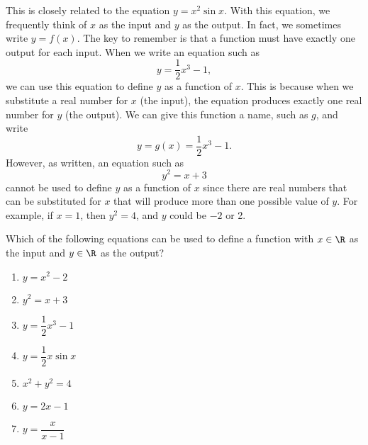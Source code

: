 \begin{previewactivity}
This is closely related to the equation  
$y = x^2 \sin x $.  With this equation, we frequently think of  $x$  as the input and  $y$  as the output.  In fact, we sometimes write  $y = f( x )$.  The key to remember is that a function must have exactly one output for each input.  When we write an equation such as  
\[
y = \dfrac{1}{2}x^3  - 1,
\]
we can use this equation to define  $y$  as a function of  $x$.  This is because when we substitute a real number for  $x$  (the input), the equation produces exactly one real number for  $y$  (the output).  We can give this function a name, such as  $g$, and write
\[
y = g( x ) = \frac{1}{2}x^3  - 1.
\]
However, as written, an equation such as  
\[
y^2  = x + 3
\]
cannot be used to define  $y$  as a function of  $x$  since there are real numbers that can be substituted for  $x$  that will produce more than one possible value of  $y$.  For example,  if  $x = 1$, then $y^2  = 4$, and  $y$  could be  $-2$  or  2.

Which of the following equations can be used to define a function with  $x \in \R$
as the input and  $y \in \R$  as the output?

\begin{multicols}{2}
\begin{enumerate}

\item $y = x^2  - 2$

\item $y^2  = x + 3$

\item $y = \dfrac{1}{2}x^3  - 1$

\item $y = \dfrac{1}{2} x\sin x$

\item $x^2  + y^2  = 4$

\item $y = 2x - 1$

\item $y = \dfrac{x}{{x - 1}}$

\end{enumerate}
\end{multicols}
\end{previewactivity}
\hbreak

\endinput
